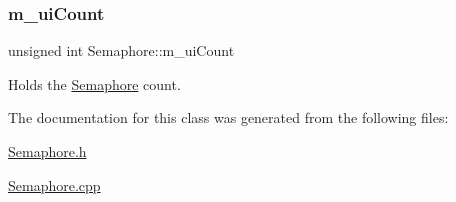\mbox{\label{classSemaphore_a1456f105008b0c309f41211afbdd5fee}} 
\subsubsection{\texorpdfstring{m\+\_\+ui\+Count}{m\_uiCount}}
{\footnotesize\ttfamily unsigned int Semaphore\+::m\+\_\+ui\+Count\hspace{0.3cm}{\ttfamily [private]}}



Holds the \hyperlink{classSemaphore}{Semaphore} count. 



The documentation for this class was generated from the following files\+:\begin{DoxyCompactItemize}
\item 
\hyperlink{Semaphore_8h}{Semaphore.\+h}\item 
\hyperlink{Semaphore_8cpp}{Semaphore.\+cpp}\end{DoxyCompactItemize}
